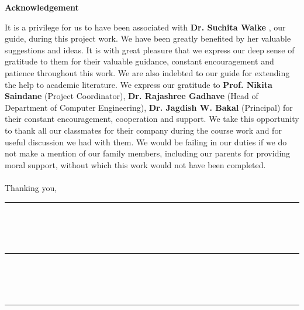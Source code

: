 \documentclass[12pt]{article}
\begin{document}
\justifying
\noindent
\begin{center}
{\Large \textbf{Acknowledgement}}\\[0.6cm]
\end{center}
\justifying

 It is a privilege for us to have been associated with \textbf{Dr. Suchita Walke} , our guide, during
 this project work. We have been greatly benefited by her valuable suggestions and ideas. It
 is with great pleasure that we express our deep sense of gratitude to them for their valuable
 guidance, constant encouragement and patience throughout this work. We are also indebted to
 our guide for extending the help to academic literature. We express our gratitude to \textbf{Prof. Nikita
 Saindane} (Project Coordinator), \textbf{Dr. Rajashree Gadhave} (Head of Department of Computer
 Engineering), \textbf{Dr. Jagdish W. Bakal} (Principal) for their constant encouragement, cooperation
 and support. We take this opportunity to thank all our classmates for their company during the
 course work and for useful discussion we had with them. We would be failing in our duties if
 we do not make a mention of our family members, including our parents for providing moral
 support, without which this work would not have been completed.
\\
\\
Thanking you,
\vspace{1cm}

\begin{flushright}
    \rule{6cm}{0.5pt} \\[-0.4cm]\\[0.1cm]
     \\[1cm]
    \rule{6cm}{0.5pt} \\[-0.4cm]\\[0.1cm]
    \\[1cm]
    \rule{6cm}{0.5pt} \\[-0.4cm]\\[0.1cm]
    \\
\end{flushright}
\end{document}
